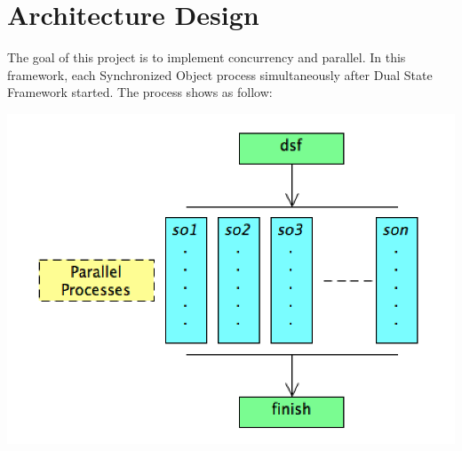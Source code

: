 \hypertarget{_framework_design_FrameworkDesignArchitectureDesign}{}\section{Architecture Design}\label{_framework_design_FrameworkDesignArchitectureDesign}
The goal of this project is to implement concurrency and parallel. In this framework, each Synchronized Object process simultaneously after Dual State Framework started. The process shows as follow\+: 
\begin{DoxyImageNoCaption}
  \mbox{\includegraphics[width=\textwidth,height=\textheight/2,keepaspectratio=true]{DesignArchitecture.png}}
\end{DoxyImageNoCaption}

